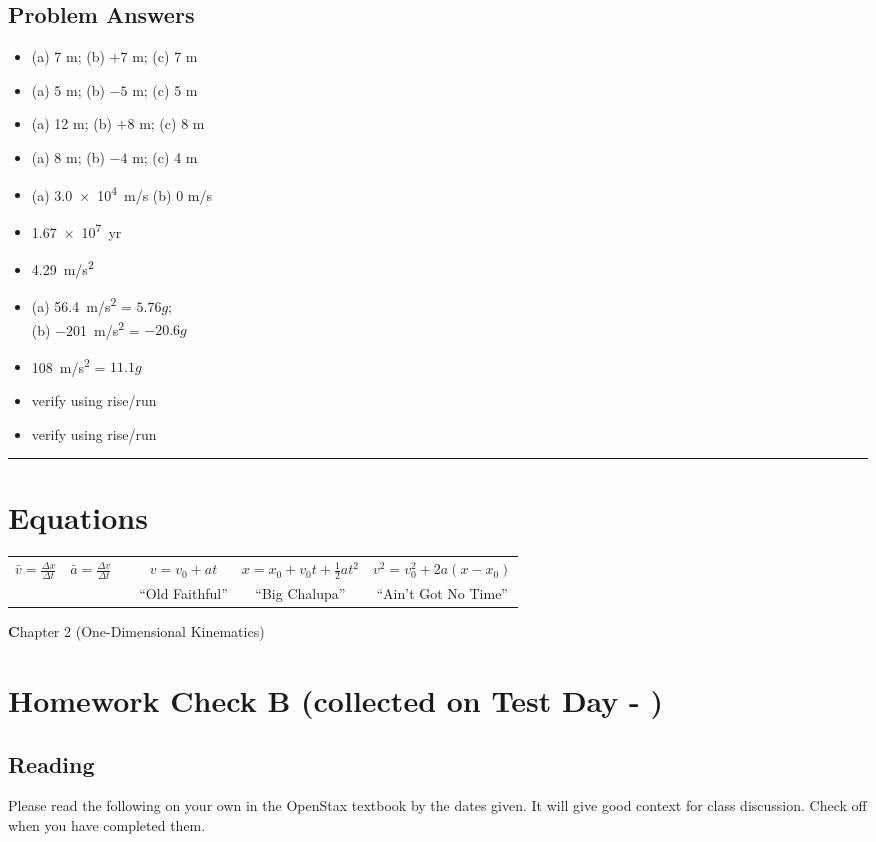 \documentclass[10pt]{exam}
\def\mytitle{Chapter 2 (One-Dimensional Kinematics)}
\def\mymaketitle{
  \begin{flushleft}
    {\LARGE \textbf \mytitle \par}
  \end{flushleft}
}
\newcommand{\mydate}{\fillin}
\newcommand{\printeqs}{
  \section*{Equations} 
  
  \begin{center}
    \begin{tabular}{cccccc}
      $\bar{v} = \frac{\Delta x}{\Delta t}$       &   
      $\bar{a} = \frac{\Delta v}{\Delta t}$       &&
      $v = v_0 + a t$                             &
      $x = x_0 + v_0t + \frac{1}{2}at^2$          &
      $v^2 = v_0^2 + 2a \left( x - x_0 \right) $  \\
          & & & ``Old Faithful'' & ``Big Chalupa'' & ``Ain't Got No Time'' \\
    \end{tabular}


  \end{center}
}
\begin{document}
\subsection*{Problem Answers}

\begin{multicols}{3}

  \begin{itemize}[noitemsep]
    \item[ 1.] (a) 7 m; (b) $+7$ m; (c) 7 m
    \item[ 2.] (a) 5 m; (b) $-5$ m; (c) 5 m
    \item[ 3.] (a) 12 m; (b) $+8$ m; (c) 8 m
    \item[ 4.] (a) 8 m; (b) $-4$ m; (c) 4 m
    \item[ 5.] (a) \SI{3.0e4}{m/s} (b) 0 m/s
    \item[ 7.] \SI{1.67e7}{yr}
    \item[16.] \SI{4.29}{m/s^2}
    \item[17.] (a) \SI{56.4}{m/s^2} = $5.76g$; \\
               (b) \SI{-201}{m/s^2} = $-20.6g$
    \columnbreak
    \item[19.] \SI{108}{m/s^2} = $11.1g$
    \item[59.] verify using rise/run
    \item[61.] verify using rise/run
  \end{itemize}
  
\end{multicols}

\vspace{1em}
\hrule 
\printeqs




\pagebreak

\mymaketitle

\section*{Homework Check B (collected on Test Day - \mydate)}

\subsection*{Reading}

Please read the following on your own in the OpenStax textbook by the dates given.  It will give good context for class discussion.  Check off when you have completed them.

\vspace{1em}
\end{document}
